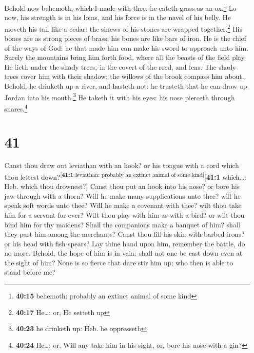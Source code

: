  Behold now behemoth, which I made with thee; he eateth
grass as an ox.\footnote{\textbf{40:15} behemoth: probably an extinct
  animal of some kind}  Lo now, his strength is in his
loins, and his force is in the navel of his belly.  He
moveth his tail like a cedar: the sinews of his stones are wrapped
together.\footnote{\textbf{40:17} He\ldots: or, He setteth up}
 His bones are as strong pieces of brass; his bones are
like bars of iron.  He is the chief of the ways of God:
he that made him can make his sword to approach unto him.
 Surely the mountains bring him forth food, where all the
beasts of the field play.  He lieth under the shady
trees, in the covert of the reed, and fens.  The shady
trees cover him with their shadow; the willows of the brook compass him
about.  Behold, he drinketh up a river, and hasteth not:
he trusteth that he can draw up Jordan into his mouth.\footnote{\textbf{40:23}
  he drinketh up: Heb. he oppresseth}  He taketh it with
his eyes: his nose pierceth through snares.\footnote{\textbf{40:24}
  He\ldots: or, Will any take him in his sight, or, bore his nose with a
  gin?}

\hypertarget{section-40}{%
\section{41}\label{section-40}}

 Canst thou draw out leviathan with an hook? or his tongue
with a cord which thou lettest down?\textsuperscript{{[}\textbf{41:1}
leviathan: probably an extinct animal of some kind{]}}{[}\textbf{41:1}
which\ldots: Heb. which thou drownest?{]}  Canst thou put
an hook into his nose? or bore his jaw through with a thorn?
 Will he make many supplications unto thee? will he speak
soft words unto thee?  Will he make a covenant with thee?
wilt thou take him for a servant for ever?  Wilt thou play
with him as with a bird? or wilt thou bind him for thy maidens?
 Shall the companions make a banquet of him? shall they
part him among the merchants?  Canst thou fill his skin
with barbed irons? or his head with fish spears?  Lay
thine hand upon him, remember the battle, do no more. 
Behold, the hope of him is in vain: shall not one be cast down even at
the sight of him?  None is so fierce that dare stir him
up: who then is able to stand before me?


